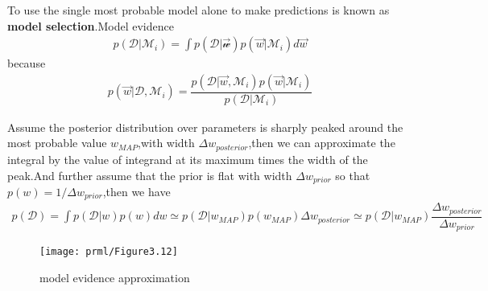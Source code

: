 To use the single most probable model alone to make predictions is known as \textbf{model selection}.Model evidence
\begin{align}
p(\mathcal{D}|\mathcal{M}_i)=\int p(\mathcal{D}|\mathcal{\vec{w}})p(\vec{w}|\mathcal{M}_i)d\vec{w}
\end{align}
because
\begin{align}
p(\vec{w}|\mathcal{D},\mathcal{M}_i)=\dfrac{p(\mathcal{D}|\vec{w},\mathcal{M}_i)p(\vec{w}|\mathcal{M}_i)}{p(\mathcal{D}|\mathcal{M}_i)}
\end{align}

Assume the posterior distribution over parameters is sharply peaked around the most probable value $w_{MAP}$,with width $\Delta w_{posterior}$,then we can approximate the integral by the value of integrand at its maximum times the width of the peak.And further assume that the prior is flat with width $\Delta w_{prior}$ so that $p(w)=1/\Delta w_{prior}$,then we have
\begin{align}
p(\mathcal{D})=\int p(\mathcal{D}|w)p(w)dw \simeq p(\mathcal{D}|w_{MAP})p(w_{MAP})\Delta w_{posterior} \simeq p(\mathcal{D}|w_{MAP})\dfrac{\Delta w_{posterior}}{\Delta w_{prior}}
\end{align}
\begin{SCfigure*}
	\caption{model evidence approximation}
	\texttt{[image: prml/Figure3.12]}
\end{SCfigure*}

